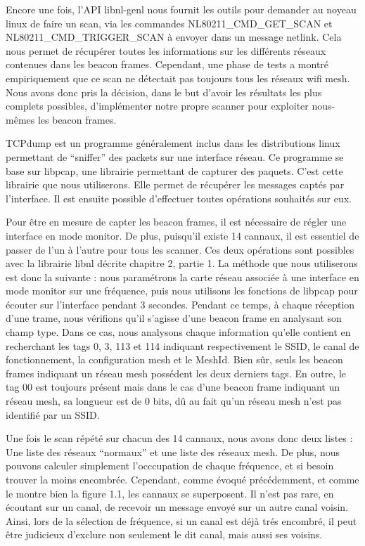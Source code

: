 Encore une fois, l'API libnl-genl nous fournit les outils pour demander au noyeau linux de faire un scan, via les commandes
NL80211\_CMD\_GET\_SCAN et NL80211\_CMD\_TRIGGER\_SCAN à envoyer dans un message netlink. Cela nous permet de récupérer toutes les
informations sur les différents réseaux contenues dans les beacon frames. Cependant, une phase de tests a montré
empiriquement que ce scan ne détectait pas toujours tous les réseaux wifi mesh. Nous avons donc pris la décision, dans le but
d'avoir les résultats les plus complets possibles, d'implémenter notre propre scanner pour exploiter nous-mêmes les beacon frames.

TCPdump est un programme généralement inclus dans les distributions linux permettant de ``sniffer'' des packets sur une interface
réseau. Ce programme se base sur libpcap\cite{SCANlib}, une librairie permettant de capturer des paquets. C'est cette librairie que
nous utiliserons. Elle permet de récupérer les messages captés par l'interface. Il est ensuite possible
d'effectuer toutes opérations souhaités sur eux.

Pour être en mesure de capter les beacon frames, il est nécessaire de régler une interface en mode monitor. De plus, puisqu'il existe
14 cannaux, il est essentiel de passer de l'un à l'autre pour tous les scanner. Ces deux opérations sont possibles avec la librairie 
libnl décrite chapitre 2, partie 1. La méthode que nous utiliserons est donc la suivante : nous paramétrons la carte réseau associée à
une interface en mode monitor sur une fréquence, puis nous utilisons les fonctions de libpcap pour écouter sur l'interface pendant 3
secondes. Pendant ce temps, à chaque réception d'une trame, nous vérifions qu'il s'agisse d'une beacon frame en analysant son champ
type. Dans ce cas, nous analysons chaque information qu'elle contient en recherchant les tags 0, 3, 113 et 114 indiquant
respectivement le SSID, le canal de fonctionnement, la configuration mesh et le MeshId. Bien sûr, seuls les beacon frames indiquant
un réseau mesh possédent les deux derniers tags. En outre, le tag 00 est toujours présent mais dans le cas d'une beacon frame 
indiquant un réseau mesh, sa longueur est de 0 bits, dû au fait qu'un réseau mesh n'est pas identifié par un SSID.

Une fois le scan répété sur chacun des 14 cannaux, nous avons donc deux listes : Une liste des réseaux ``normaux'' et une liste des
réseaux mesh. De plus, nous pouvons calculer simplement l'occcupation de chaque fréquence, et si besoin trouver la moins encombrée.
Cependant, comme évoqué précédemment, et comme le montre bien la figure 1.1, les cannaux se superposent. Il n'est pas rare, en
écoutant sur un canal, de recevoir un message envoyé sur un autre canal voisin. Ainsi, lors de la sélection de fréquence, si un canal
est déjà trés encombré, il peut être judicieux d'exclure non seulement le dit canal, mais aussi ses voisins.